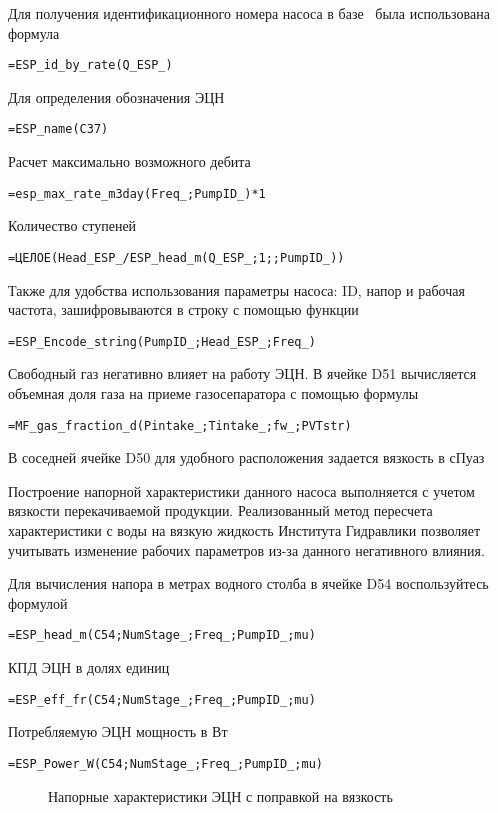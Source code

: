 Для получения идентификационного номера насоса в базе \unf \ была использована формула

{ \small  \texttt{=ESP\_id\_by\_rate(Q\_ESP\_)}}

Для определения обозначения ЭЦН

{ \small  \texttt{=ESP\_name(C37)}}

Расчет максимально возможного дебита

{ \small  \texttt{=esp\_max\_rate\_m3day(Freq\_;PumpID\_)*1}}

Количество ступеней

{ \small  \texttt{=ЦЕЛОЕ(Head\_ESP\_/ESP\_head\_m(Q\_ESP\_;1;;PumpID\_))
}}

Также для удобства использования параметры насоса: ID, напор и рабочая частота, зашифровываются в строку с помощью функции

{ \small  \texttt{=ESP\_Encode\_string(PumpID\_;Head\_ESP\_;Freq\_)}}

Свободный газ негативно влияет на работу ЭЦН. В ячейке D51 вычисляется объемная доля газа на приеме газосепаратора с помощью формулы

{ \small  \texttt{=MF\_gas\_fraction\_d(Pintake\_;Tintake\_;fw\_;PVTstr)}}
 
В соседней ячейке D50 для удобного расположения задается вязкость в сПуаз

Построение напорной характеристики данного насоса выполняется с учетом вязкости перекачиваемой продукции. Реализованный метод пересчета характеристики с воды на вязкую жидкость Института Гидравлики позволяет учитывать изменение рабочих параметров из-за данного негативного влияния.

Для вычисления напора в метрах водного столба в ячейке D54 воспользуйтесь формулой

{ \small  \texttt{=ESP\_head\_m(C54;NumStage\_;Freq\_;PumpID\_;mu)}}

КПД ЭЦН в долях единиц 

{ \small  \texttt{=ESP\_eff\_fr(C54;NumStage\_;Freq\_;PumpID\_;mu)}}

Потребляемую ЭЦН мощность в Вт

{ \small  \texttt{=ESP\_Power\_W(C54;NumStage\_;Freq\_;PumpID\_;mu)}}

\begin{figure}[h!]
	\center{\texttt{[image: Ex70\_3]}}
	\caption{Напорные характеристики ЭЦН с поправкой на вязкость}
	\label{ris:Ex70_3}
\end{figure}

